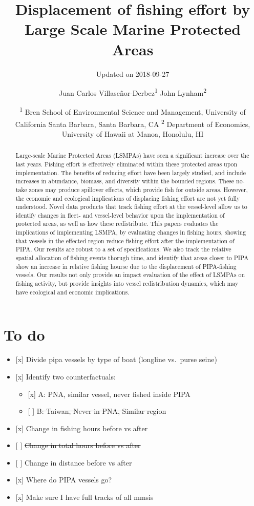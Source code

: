 \documentclass[]{article}
\title{Displacement of fishing effort by Large Scale Marine Protected Areas}
\subtitle{Updated on 2018-09-27}
\author{Juan Carlos Villaseñor-Derbez\textsuperscript{1} John
Lynham\textsuperscript{2}}
\date{\textsuperscript{1} Bren School of Environmental Science and Management,
University of California Santa Barbara, Santa Barbara, CA
\textsuperscript{2} Department of Economics, University of Hawaii at
Manoa, Honolulu, HI}
\providecommand{\tightlist}{%
  \setlength{\itemsep}{0pt}\setlength{\parskip}{0pt}}
\begin{document}
\maketitle
\begin{abstract}
Large-scale Marine Protected Areas (LSMPAs) have seen a significant
increase over the last years. Fishing effort is effectively eliminated
within these protected areas upon implementation. The benefits of
reducing effort have been largely studied, and include increases in
abundance, biomass, and diversity within the bounded regions. These
no-take zones may produce spillover effects, which provide fish for
outside areas. However, the economic and ecological implications of
displacing fishing effort are not yet fully understood. Novel data
products that track fishing effort at the vessel-level allow us to
identify changes in fleet- and vessel-level behavior upon the
implementation of protected areas, as well as how these redistribute.
This papers evaluates the implications of implementing LSMPA, by
evaluating changes in fishing hours, showing that vessels in the
effected region reduce fishing effort after the implementation of PIPA.
Our results are robust to a set of specifications. We also track the
relative spatial allocation of fishing events thorugh time, and identify
that areas closer to PIPA show an increase in relative fishing hourse
due to the displacement of PIPA-fishing vessels. Our results not only
provide an impact evaluation of the effect of LSMPAs on fishing
activity, but provide insights into vessel redistribution dynamics,
which may have ecological and economic implications.
\end{abstract}

{
\setcounter{tocdepth}{4}
\tableofcontents
}
\section{To do}\label{to-do}

\begin{itemize}
\tightlist
\item
  {[}x{]} Divide pipa vessels by type of boat (longline vs.~purse seine)
\item
  {[}x{]} Identify two counterfactuals:

  \begin{itemize}
  \tightlist
  \item
    {[}x{]} A: PNA, similar vessel, never fished inside PIPA
  \item
    {[} {]} \sout{B: Taiwan, Never in PNA, Similar region}
  \end{itemize}
\item
  {[}x{]} Change in fishing hours before vs after
\item
  {[} {]} \sout{Change in total hours before vs after}
\item
  {[} {]} Change in distance before vs after
\item
  {[}x{]} Where do PIPA vessels go?
\item
  {[}x{]} Make sure I have full tracks of all mmsis
\end{itemize}
\end{document}
